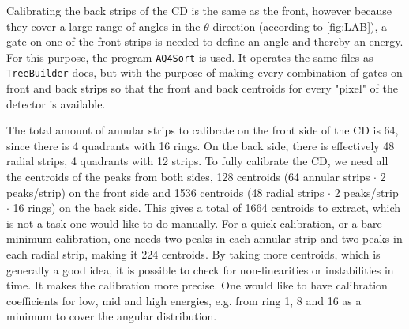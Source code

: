 \documentclass[twoside,english]{uiofysmaster/uiofysmaster}
\let\orgautoref\autoref
\renewcommand{\autoref}
        {%
		 \def\sectionautorefname{Section}%
		 \def\subsectionautorefname{Section}%
		 \def\subsubsectionautorefname{Section}%
		 \def\chapterautorefname{Chapter}%
          \orgautoref}
\begin{document}
Calibrating the back strips of the CD is the same as the front, however because they cover a large range of angles in the $\theta$ direction (according to \autoref{fig:LAB}), a gate on one of the front strips is needed to define an angle and thereby an energy. 
For this purpose, the program \texttt{AQ4Sort} is used. 
It operates the same files as \texttt{TreeBuilder} does, but with the purpose of making every combination of gates on front and back strips so that the front and back centroids for every "pixel" of the detector is available.

The total amount of annular strips to calibrate on the front side of the CD is 64, since there is 4 quadrants with 16 rings. 
On the back side, there is effectively 48 radial strips, 4 quadrants with 12 strips.
To fully calibrate the CD, we need all the centroids of the peaks from both sides, 128 centroids (64 annular strips $\cdot$ 2 peaks/strip) on the front side and 1536 centroids (48 radial strips $\cdot$ 2 peaks/strip $\cdot$ 16 rings) on the back side. 
This gives a total of 1664 centroids to extract, which is not a task one would like to do manually.
For a quick calibration, or a bare minimum calibration, one needs two peaks in each annular strip and two peaks in each radial strip, making it 224 centroids.
By taking more centroids, which is generally a good idea, it is possible to check for non-linearities or instabilities in time.
It makes the calibration more precise.
One would like to have calibration coefficients for low, mid and high energies, e.g. from ring 1, 8 and 16 as a minimum to cover the angular distribution.
\end{document}
